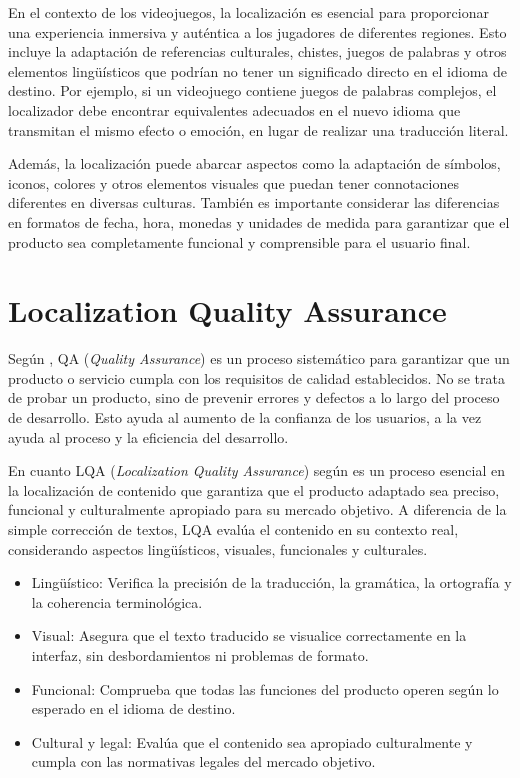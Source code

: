 En el contexto de los videojuegos, la localización es esencial para proporcionar una experiencia inmersiva y auténtica a los jugadores de diferentes regiones. Esto incluye la adaptación de referencias culturales, chistes, juegos de palabras y otros elementos lingüísticos que podrían no tener un significado directo en el idioma de destino. Por ejemplo, si un videojuego contiene juegos de palabras complejos, el localizador debe encontrar equivalentes adecuados en el nuevo idioma que transmitan el mismo efecto o emoción, en lugar de realizar una traducción literal.

Además, la localización puede abarcar aspectos como la adaptación de símbolos, iconos, colores y otros elementos visuales que puedan tener connotaciones diferentes en diversas culturas. También es importante considerar las diferencias en formatos de fecha, hora, monedas y unidades de medida para garantizar que el producto sea completamente funcional y comprensible para el usuario final. 

\section{Localization Quality Assurance}
\label{sec:LQA}

Según \cite{QA}, QA (\textit{Quality Assurance}) es un proceso sistemático para garantizar que un producto o servicio cumpla con los requisitos de calidad establecidos.
No se trata de probar un producto, sino de prevenir errores y defectos a lo largo del proceso de desarrollo.
Esto ayuda al aumento de la confianza de los usuarios, a la vez ayuda al proceso y la eficiencia del desarrollo.

En cuanto LQA (\textit{Localization Quality Assurance}) según \cite{LQA} es un proceso esencial en la localización de contenido que garantiza que el producto adaptado sea preciso, funcional y culturalmente apropiado para su mercado objetivo. A diferencia de la simple corrección de textos, LQA evalúa el contenido en su contexto real, considerando aspectos lingüísticos, visuales, funcionales y culturales.

\begin{itemize}
\item Lingüístico: Verifica la precisión de la traducción, la gramática, la ortografía y la coherencia terminológica.
\item Visual: Asegura que el texto traducido se visualice correctamente en la interfaz, sin desbordamientos ni problemas de formato.
\item Funcional: Comprueba que todas las funciones del producto operen según lo esperado en el idioma de destino.
\item Cultural y legal: Evalúa que el contenido sea apropiado culturalmente y cumpla con las normativas legales del mercado objetivo.

\end{itemize}

